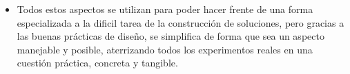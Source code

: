 \begin{itemize}
	\item Todos estos aspectos se utilizan para poder hacer frente de una forma especializada a la dificil tarea de la construcción de soluciones, pero gracias a las buenas prácticas de diseño, se simplifica de forma que sea un aspecto manejable y posible, aterrizando todos los experimentos reales en una cuestión práctica, concreta y tangible.
\end{itemize}